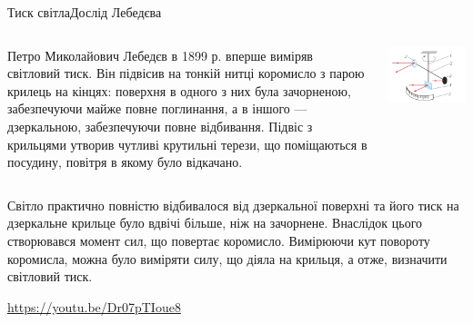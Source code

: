 \documentclass[onlytextwidth]{beamer}
\begin{document}
\begin{frame}{Тиск світла}{Дослід Лебедєва}
	\begin{columns}
		\begin{column}{0.5\linewidth}\small\justifying
			Петро Миколайович Лебедєв в 1899 р. вперше виміряв світловий тиск. Він підвісив на тонкій нитці коромисло з парою крилець на кінцях: поверхня в одного з них була зачорненою, забезпечуючи майже повне поглинання, а в іншого --- дзеркальною, забезпечуючи повне відбивання. Підвіс з крильцями утворив чутливі крутильні терези, що поміщаються в посудину, повітря в якому було відкачано.
		\end{column}
		\begin{column}{0.5\linewidth}\centering
			\includegraphics[width=\linewidth]{LebedevExp}
		\end{column}
	\end{columns}

	\begin{block}{}\small\justifying
		Світло практично повністю відбивалося від дзеркальної поверхні та його тиск на дзеркальне крильце було вдвічі більше, ніж на зачорнене. Внаслідок цього створювався момент сил, що повертає коромисло. Вимірюючи кут повороту коромисла, можна було виміряти силу, що діяла на крильця, а отже, визначити світловий тиск.
	\end{block}
	{\tiny \url{https://youtu.be/Dr07pTIoue8}}
\end{frame}
\end{document}
